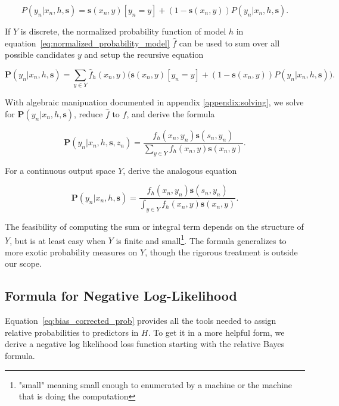 \documentclass[twoside]{article}
\begin{document}
\[P(y_n|x_n,h,\mathbf{s})=\mathbf{s}(x_n,y)\left [y_n = y\right ] + (1-\mathbf{s}(x_n,y))P(y_n|x_n,h,\mathbf{s}).\]

If \(Y\) is discrete, the normalized probability function of model \(h\) in equation~\eqref{eq:normalized_probability_model} \(\hat{f}\) can be used to sum over all possible candidates \(y\) and setup the recursive equation

\begin{equation}
\label{eq:bias_corrected_setup}
\mathbf{P}(y_n|x_n,h,\mathbf{s})=\sum_{y \in Y}\hat{f}_h(x_n,y)\big(\mathbf{s}(x_n,y)\left [y_n = y\right ] + (1-\mathbf{s}(x_n,y))P(y_n|x_n,h,\mathbf{s})\big).
\end{equation}

With algebraic manipuation documented in appendix \ref{appendix:solving}, we solve for \(\mathbf{P}(y_n|x_n,h,\mathbf{s})\), reduce \(\hat{f}\) to \(f\), and derive the formula

\begin{equation}
\label{eq:bias_corrected_prob}
\mathbf{P}(y_n|x_n,h,\mathbf{s},z_n)=\frac{f_h(x_n,y_n)\mathbf{s}(s_n,y_n)}{\sum_{y \in Y}f_h(x_n,y)\mathbf{s}(x_n,y)}.
\end{equation}

For a continuous output space \(Y\), derive the analogous equation

\begin{equation}
\label{eq:bias_corrected_prob_continuous}
\mathbf{P}(y_n|x_n,h,\mathbf{s})=\frac{f_h(x_n,y_n)\mathbf{s}(s_n,y_n)}{\int_{y \in Y}f_h(x_n,y)\mathbf{s}(x_n,y)}.
\end{equation}

The feasibility of computing the sum or integral term depends on the structure of \(Y\), but is at least easy when \(Y\) is finite and small\footnote{"small" meaning small enough to enumerated by a machine or the machine that is doing the computation}. The formula generalizes to more exotic probability measures on \(Y\), though the rigorous treatment is outside our scope.

\subsection{Formula for Negative Log-Likelihood}

Equation~\eqref{eq:bias_corrected_prob} provides all the tools needed to assign relative probabilities to predictors in \(H\). To get it in a more helpful form, we derive a negative log likelihood loss function starting with the relative Bayes formula.
\end{document}
